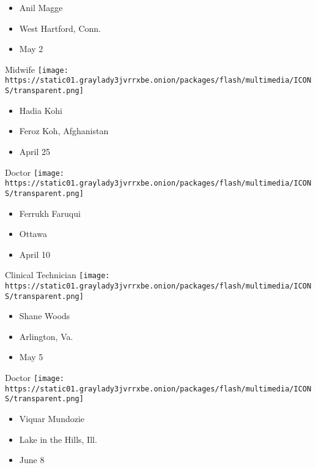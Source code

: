 \begin{itemize}
\tightlist
\item
  Anil Magge
\item
  West Hartford, Conn.
\item
  May 2
\end{itemize}

\protect\hyperlink{item-hadia-kohi}{}

Midwife
\texttt{[image: https://static01.graylady3jvrrxbe.onion/packages/flash/multimedia/ICONS/transparent.png]}

\begin{itemize}
\tightlist
\item
  Hadia Kohi
\item
  Feroz Koh, Afghanistan
\item
  April 25
\end{itemize}

\protect\hyperlink{item-ferrukh-faruqui}{}

Doctor
\texttt{[image: https://static01.graylady3jvrrxbe.onion/packages/flash/multimedia/ICONS/transparent.png]}

\begin{itemize}
\tightlist
\item
  Ferrukh Faruqui
\item
  Ottawa
\item
  April 10
\end{itemize}

\protect\hyperlink{item-shane-woods}{}

Clinical Technician
\texttt{[image: https://static01.graylady3jvrrxbe.onion/packages/flash/multimedia/ICONS/transparent.png]}

\begin{itemize}
\tightlist
\item
  Shane Woods
\item
  Arlington, Va.
\item
  May 5
\end{itemize}

\protect\hyperlink{item-viquar-mundozie}{}

Doctor
\texttt{[image: https://static01.graylady3jvrrxbe.onion/packages/flash/multimedia/ICONS/transparent.png]}

\begin{itemize}
\tightlist
\item
  Viquar Mundozie
\item
  Lake in the Hills, Ill.
\item
  June 8
\end{itemize}

